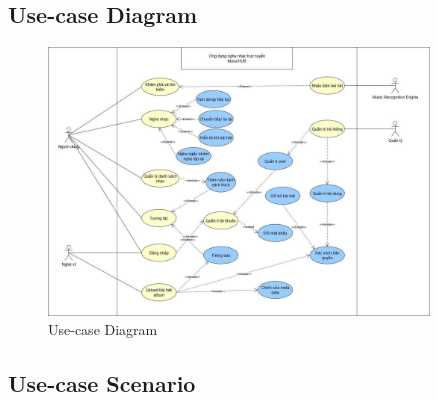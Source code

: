 \documentclass[a4paper]{article}
\begin{document}
\subsection{Use-case Diagram}
\begin{figure}[H]
	\centering
	\includegraphics[width=0.9\textwidth]{Images/usecase_diagram.jpg}
	\caption{Use-case Diagram}
	\label{fig:usecase_diagram}
\end{figure}

\newpage
\subsection{Use-case Scenario}
\end{document}
